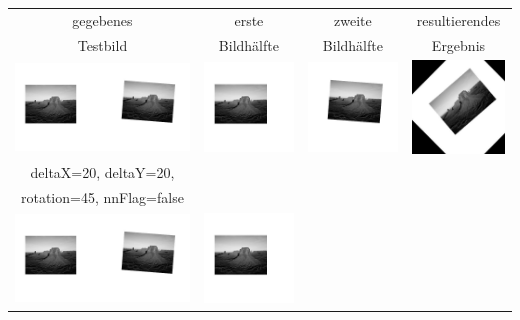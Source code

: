 \documentclass[12pt,german]{article}
\begin{document}
\begin{table}[H]
  \centering
  \begin{tabular}{| c | c | c | c |}
	\hline
	gegebenes & erste & zweite & resultierendes \\	
	Testbild & Bildhälfte & Bildhälfte & Ergebnis \\ 
    \hline
    \includegraphics[width=5cm]{images/register/gray1.jpg}  &
    \includegraphics[width=2.5cm]{images/register/first-half-image-01.jpg} &
    \includegraphics[width=2.5cm]{images/register/second-half-image-01.jpg} &
    \includegraphics[width=2.5cm]{images/register/transformed-image-01.jpg} \\
    \hline
	deltaX=20, deltaY=20, \\rotation=45, nnFlag=false \\
     \hline
    \includegraphics[width=5cm]{images/register/gray1.jpg}  &
    \includegraphics[width=2.5cm]{images/register/first-half-image-01.jpg} &

\end{tabular}
\end{table}
\end{document}
